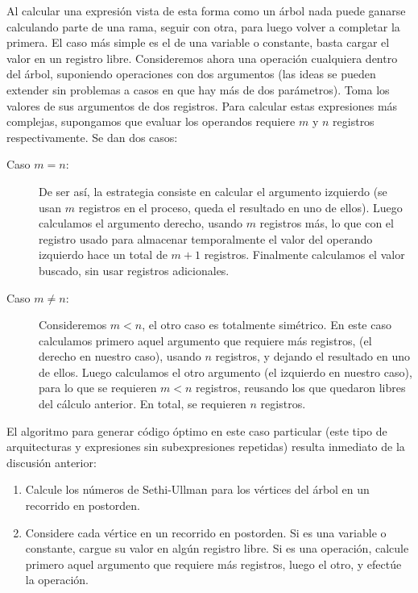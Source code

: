   Al calcular una expresión
  vista de esta forma como un árbol
  nada puede ganarse calculando parte de una rama,
  seguir con otra,
  para luego volver a completar la primera.
  El caso más simple es el de una variable o constante,
  basta cargar el valor en un registro libre.
  Consideremos ahora una operación cualquiera dentro del árbol,
  suponiendo operaciones con dos argumentos
  (las ideas se pueden extender sin problemas
   a casos en que hay más de dos parámetros).
  Toma los valores de sus argumentos de dos registros.
  Para calcular estas expresiones más complejas,
  supongamos que evaluar los operandos
  requiere \(m\) y \(n\) registros respectivamente.
  Se dan dos casos:
  \begin{description}
  \item[\boldmath Caso \(m = n\):\unboldmath]
    De ser así,
    la estrategia consiste en calcular el argumento izquierdo
    (se usan \(m\) registros en el proceso,
     queda el resultado en uno de ellos).
    Luego calculamos el argumento derecho,
    usando \(m\) registros más,
    lo que con el registro usado para almacenar temporalmente
    el valor del operando izquierdo
    hace un total de \(m + 1\) registros.
    Finalmente calculamos el valor buscado,
    sin usar registros adicionales.
  \item[\boldmath Caso \(m \ne n\):\unboldmath]
    Consideremos \(m < n\),
    el otro caso es totalmente simétrico.
    En este caso calculamos primero aquel argumento
    que requiere más registros,
    (el derecho en nuestro caso),
    usando \(n\) registros,
    y dejando el resultado en uno de ellos.
    Luego calculamos el otro argumento
    (el izquierdo en nuestro caso),
    para lo que se requieren \(m < n\) registros,
    reusando los que quedaron libres del cálculo anterior.
    En total,
    se requieren \(n\) registros.
  \end{description}
  El algoritmo para generar código óptimo en este caso particular
  (este tipo de arquitecturas
   y expresiones sin subexpresiones repetidas)
  resulta inmediato de la discusión anterior:
  \begin{enumerate}
  \item
    Calcule los números de Sethi-Ullman para los vértices del árbol
    en un recorrido en postorden.%
  \item
    Considere cada vértice en un recorrido en postorden.
    Si es una variable o constante,
    cargue su valor en algún registro libre.
    Si es una operación,
    calcule primero aquel argumento que requiere más registros,
    luego el otro,
    y efectúe la operación.
  \end{enumerate}
